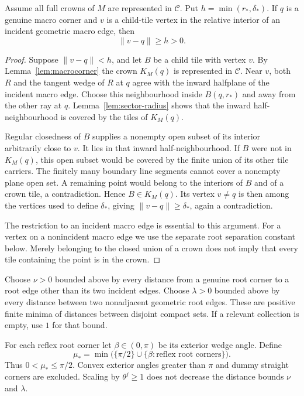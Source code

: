 \begin{lemma}
\label{lem:endpoint-gap}
Assume all full crowns of $M$ are represented in $\mathcal C$.  Put
$h=\min(r_*,\delta_*)$.  If $q$ is a genuine macro corner and $v$ is a
child-tile vertex in the relative interior of an incident geometric macro
edge, then
\[
  \lVert v-q\rVert\ge h>0.
\]
\end{lemma}
\begin{proof}
Suppose $\lVert v-q\rVert<h$, and let $B$ be a child tile with vertex $v$.
By Lemma~\ref{lem:macrocorner} the crown $K_M(q)$ is represented in
$\mathcal C$.  Near $v$, both $R$ and the tangent wedge of $R$ at $q$
agree with the inward halfplane of the incident macro edge.  Choose this
neighbourhood inside $B(q,r_*)$ and away from the other ray at $q$.
Lemma~\ref{lem:sector-radius} shows that the inward half-neighbourhood is
covered by the tiles of $K_M(q)$.

Regular closedness of $B$ supplies a nonempty open subset of its interior
arbitrarily close to $v$.  It lies in that inward half-neighbourhood.  If
$B$ were not in $K_M(q)$, this open subset would be covered by the finite
union of its other tile carriers.  The finitely many boundary line
segments cannot cover a nonempty plane open set.  A remaining point would
belong to the interiors of $B$ and of a crown tile, a contradiction.
Hence $B\in K_M(q)$.  Its vertex $v\ne q$ is then among the vertices used
to define $\delta_*$, giving $\lVert v-q\rVert\ge\delta_*$, again a
contradiction.

The restriction to an incident macro edge is essential to this argument.
For a vertex on a nonincident macro edge we use the separate root
separation constant below.  Merely belonging to the closed union of a
crown does not imply that every tile containing the point is in the crown.
\end{proof}

\begin{definition}
\label{def:crown-separation}
Choose $\nu>0$ bounded above by every distance from a genuine root corner
to a root edge other than its two incident edges.  Choose $\lambda>0$
bounded above by every distance between two nonadjacent geometric root
edges.  These are positive finite minima of distances between disjoint
compact sets.  If a relevant collection is empty, use $1$ for that bound.

For each reflex root corner let $\beta\in(0,\pi)$ be its exterior wedge
angle.  Define
\[
  \mu_* =\min\bigl(\{\pi/2\}\cup
          \{\beta:\text{reflex root corners}\}\bigr).
\]
Thus $0<\mu_*\le\pi/2$.  Convex exterior angles greater than $\pi$ and
dummy straight corners are excluded.  Scaling by $\theta^j\ge1$ does
not decrease the distance bounds $\nu$ and $\lambda$.
\end{definition}

